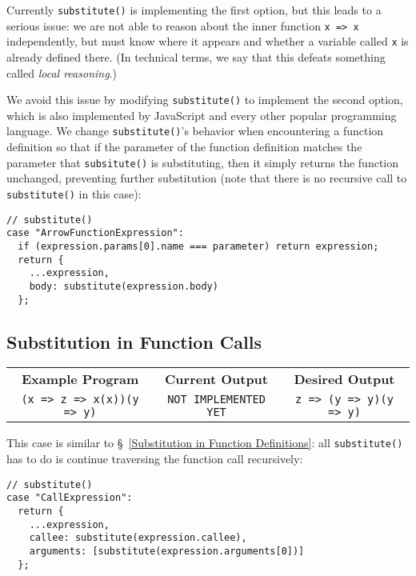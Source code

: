 \documentclass[12pt, oneside]{book}
\begin{document}
Currently \texttt{substitute()} is implementing the first option, but this leads to a serious issue: we are not able to reason about the inner function \texttt{x => x} independently, but must know where it appears and whether a variable called \texttt{x} is already defined there. (In technical terms, we say that this defeats something called \emph{local reasoning}.)

We avoid this issue by modifying \texttt{substitute()} to implement the second option, which is also implemented by JavaScript and every other popular programming language. We change \texttt{substitute()}’s behavior when encountering a function definition so that if the parameter of the function definition matches the parameter that \texttt{subsitute()} is substituting, then it simply returns the function unchanged, preventing further substitution (note that there is no recursive call to \texttt{substitute()} in this case):

\begin{verbatim}
// substitute()
case "ArrowFunctionExpression":
  if (expression.params[0].name === parameter) return expression;
  return {
    ...expression,
    body: substitute(expression.body)
  };
\end{verbatim}

\subsection{Substitution in Function Calls}

\begin{center}
\begin{tabular}{c|c|c}
\textbf{Example Program} & \textbf{Current Output} & \textbf{Desired Output} \\
\texttt{(x => z => x(x))(y => y)} & \texttt{NOT IMPLEMENTED YET} & \texttt{z => (y => y)(y => y)} \\
\end{tabular}
\end{center}

\noindent This case is similar to §~\ref{Substitution in Function Definitions}: all \texttt{substitute()} has to do is continue traversing the function call recursively:

\begin{verbatim}
// substitute()
case "CallExpression":
  return {
    ...expression,
    callee: substitute(expression.callee),
    arguments: [substitute(expression.arguments[0])]
  };
\end{verbatim}
\end{document}
